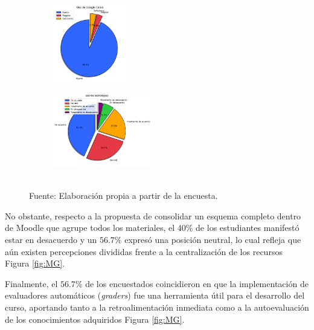 \documentclass[letter,oneside,12pt,spanish]{report}
\begin{document}
\begin{figure}[h]
	\centering
    \begin{subfigure}
        \centering
        \includegraphics[width=0.355\textwidth]{Figs/uso_colab.pdf}
    \end{subfigure}
	\hfill
    \begin{subfigure}
        \centering
        \includegraphics[width=0.475\textwidth]{Figs/uso_tecnologias.pdf}
    \end{subfigure}
	\label{fig:CT}
	\\ Fuente: Elaboración propia a partir de la encuesta.
\end{figure}

No obstante, respecto a la propuesta de consolidar un esquema completo dentro de Moodle que agrupe todos los materiales, el $40\%$ de los estudiantes manifestó estar en desacuerdo y un $56.7\%$ expresó una posición neutral, lo cual refleja que aún existen percepciones divididas frente a la centralización de los recursos Figura \ref{fig:MG}.

Finalmente, el $56.7\%$ de los encuestados coincidieron en que la implementación de evaluadores automáticos (\textit{graders}) fue una herramienta útil para el desarrollo del curso, aportando tanto a la retroalimentación inmediata como a la autoevaluación de los conocimientos adquiridos Figura \ref{fig:MG}.
\end{document}
